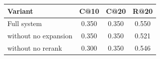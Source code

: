 \begin{tabular}{lccc}
\toprule
Variant & C@10 & C@20 & R@20 \\
\midrule
Full system & 0.350 & 0.350 & 0.550 \\
\quad without no expansion & 0.350 & 0.350 & 0.521 \\
\quad without no rerank & 0.300 & 0.350 & 0.546 \\
\bottomrule
\end{tabular}
